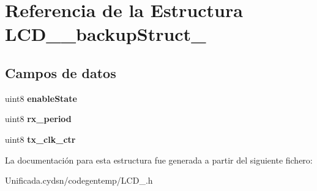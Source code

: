 \hypertarget{struct_l_c_d__1__backup_struct__}{}\section{Referencia de la Estructura L\+C\+D\+\_\+\_\+backup\+Struct\+\_\+}
\label{struct_l_c_d__1__backup_struct__}
\subsection*{Campos de datos}
\begin{DoxyCompactItemize}
\item 
\mbox{\label{struct_l_c_d__1__backup_struct___a0d9eac82e0d9647810c46a0da6e36302}} 
uint8 {\bfseries enable\+State}
\item 
\mbox{\label{struct_l_c_d__1__backup_struct___ae3d4a93a1533c2c9d210fe52c0d0d387}} 
uint8 {\bfseries rx\+\_\+period}
\item 
\mbox{\label{struct_l_c_d__1__backup_struct___a122d7b41973eb1a1e80482af3f40a9fe}} 
uint8 {\bfseries tx\+\_\+clk\+\_\+ctr}
\end{DoxyCompactItemize}


La documentación para esta estructura fue generada a partir del siguiente fichero\+:\begin{DoxyCompactItemize}
\item 
Unificada.\+cydsn/codegentemp/L\+C\+D\+\_.\+h\end{DoxyCompactItemize}
